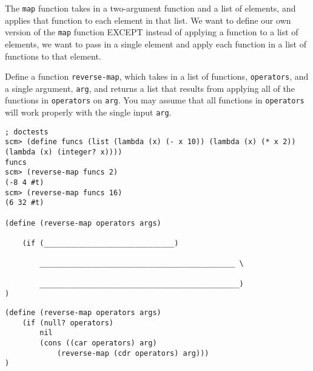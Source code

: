 \question
The \lstinline{map} function takes in a two-argument function and a list of elements, and applies that function to each element in that list. We want to define our own version of the \lstinline{map} function EXCEPT instead of applying a function to a list of elements, we want to pass in a single element and apply each function in a list of functions to that element.

Define a function \lstinline{reverse-map}, which takes in a list of functions, \lstinline{operators}, and a single argument, \lstinline{arg}, and returns a list that results from applying all of the functions in \lstinline{operators} on \lstinline{arg}. You may assume that all functions in \lstinline{operators} will work properly with the single input \lstinline{arg}.

\begin{lstlisting}
; doctests
scm> (define funcs (list (lambda (x) (- x 10)) (lambda (x) (* x 2)) (lambda (x) (integer? x))))
funcs
scm> (reverse-map funcs 2)
(-8 4 #t)
scm> (reverse-map funcs 16)
(6 32 #t)

(define (reverse-map operators args)

    (if (______________________________)

        _____________________________________________ \

        ______________________________________________)
)
\end{lstlisting}

\begin{solution}
\begin{lstlisting}
(define (reverse-map operators args)
    (if (null? operators)
        nil
        (cons ((car operators) arg) 
            (reverse-map (cdr operators) arg)))
)
\end{lstlisting}
\end{solution}